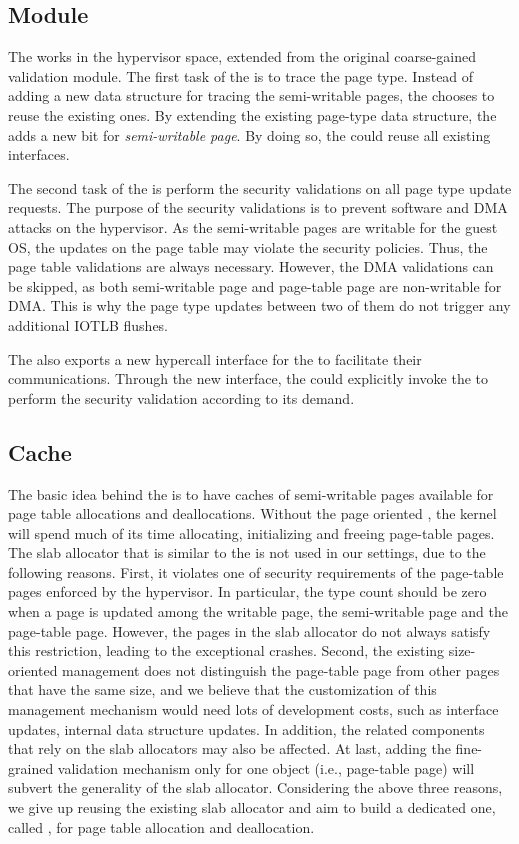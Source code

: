 \subsection{\name Module}\label{sec:module}
The \module works in the hypervisor space, extended from the original coarse-gained validation module.
The first task of the \module is to trace the page type.
Instead of adding a new data structure for tracing the semi-writable pages, the \module chooses to reuse the existing ones.
By extending the existing page-type data structure, the \module adds a new bit for \emph{semi-writable page}.
By doing so, the \module could reuse all existing interfaces.

The second task of the \module is perform the security validations on all page type update requests.
The purpose of the security validations is to prevent software and DMA attacks on the hypervisor.
As the semi-writable pages are writable for the guest OS, the updates on the page table may violate the security policies. Thus, the page table validations are always necessary.
However, the DMA validations can be skipped, as both semi-writable page and page-table page are non-writable for DMA.
This is why the page type updates between two of them do not trigger any additional IOTLB flushes.

The \module also exports a new hypercall interface for the \cache to facilitate their communications.
Through the new interface, the \cache could explicitly invoke the \module to perform the security validation according to its demand.

\subsection{\name Cache}\label{sec:cache}
The basic idea behind the \cache is to have caches of semi-writable pages available for page table allocations and deallocations.
Without the page oriented \cache, the kernel will spend much of its time allocating, initializing and freeing page-table pages.
The slab allocator that is similar to the \cache is not used in our settings, due to the following reasons.
First, it violates one of security requirements of the page-table pages enforced by the hypervisor.
In particular, the type count should be zero when a page is updated among the writable page, the semi-writable page and the page-table page.
However, the pages in the slab allocator do not always satisfy this restriction, leading to the exceptional crashes.
Second, the existing size-oriented management does not distinguish the page-table page from other pages that have the same size, and we believe that the customization of this management mechanism would need lots of development costs, such as interface updates, internal data structure updates.
In addition, the related components that rely on the slab allocators may also be affected.
At last, adding the fine-grained validation mechanism only for one object (i.e., page-table page) will subvert the generality of the slab allocator.
Considering the above three reasons, we give up reusing the existing slab allocator and aim to build a dedicated one, called \cache, for page table allocation and deallocation.


